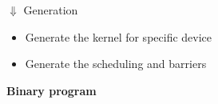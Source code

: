 \documentclass[11pt]{article}
\def\ul{\begin{itemize}}
\def\ule{\end{itemize}}
\def\ol{\begin{enumerate}}
\def\ole{\end{enumerate}}
\begin{document}
$\Downarrow$ Generation\ul
\item Generate the kernel for specific device
\item Generate the scheduling and barriers
\ule

\textbf{Binary program}


\end{document}
